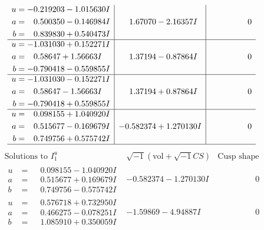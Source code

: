 \documentclass[1p]{elsarticle_modified}
\theoremstyle{definition}
\newcommand{\I}{\sqrt{-1}}
\begin{document}
$$\begin{array}{c|c|c}
\begin{aligned}
u &= -0.219203 - 1.015630 I \\
a &= \phantom{-}0.500350 - 0.146984 I \\
b &= \phantom{-}0.839830 + 0.540473 I\end{aligned}
 & \phantom{-}1.67070 - 2.16357 I & \phantom{-0.000000 } 0 \\ \hline\begin{aligned}
u &= -1.031030 + 0.152271 I \\
a &= \phantom{-}0.58647 + 1.56663 I \\
b &= -0.790418 - 0.559855 I\end{aligned}
 & \phantom{-}1.37194 - 0.87864 I & \phantom{-0.000000 } 0 \\ \hline\begin{aligned}
u &= -1.031030 - 0.152271 I \\
a &= \phantom{-}0.58647 - 1.56663 I \\
b &= -0.790418 + 0.559855 I\end{aligned}
 & \phantom{-}1.37194 + 0.87864 I & \phantom{-0.000000 } 0 \\ \hline\begin{aligned}
u &= \phantom{-}0.098155 + 1.040920 I \\
a &= \phantom{-}0.515677 - 0.169679 I \\
b &= \phantom{-}0.749756 + 0.575742 I\end{aligned}
 & -0.582374 + 1.270130 I & \phantom{-0.000000 } 0\\
 \hline 
 \end{array}$$\newpage$$\begin{array}{c|c|c}  
\text{Solutions to }I^u_{1}& \I (\text{vol} + \sqrt{-1}CS) & \text{Cusp shape}\\
 \hline 
\begin{aligned}
u &= \phantom{-}0.098155 - 1.040920 I \\
a &= \phantom{-}0.515677 + 0.169679 I \\
b &= \phantom{-}0.749756 - 0.575742 I\end{aligned}
 & -0.582374 - 1.270130 I & \phantom{-0.000000 } 0 \\ \hline\begin{aligned}
u &= \phantom{-}0.576718 + 0.732950 I \\
a &= \phantom{-}0.466275 - 0.078251 I \\
b &= \phantom{-}1.085910 + 0.350059 I\end{aligned}
 & -1.59869 - 4.94887 I & \phantom{-0.000000 } 0 \\ \hline\begin{aligned}

\end{aligned}
\end{array}$$
\end{document}
